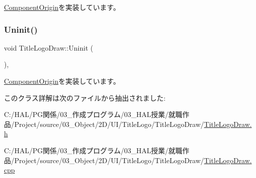 \mbox{\hyperlink{class_component_origin_a9f674891257f2272b1636d8b6bb05d81}{Component\+Origin}}を実装しています。

\mbox{\label{class_title_logo_draw_a07bbf9e8de5c7b9ee028408496c13c50}} 
\subsubsection{\texorpdfstring{Uninit()}{Uninit()}}
{\footnotesize\ttfamily void Title\+Logo\+Draw\+::\+Uninit (\begin{DoxyParamCaption}{ }\end{DoxyParamCaption})\hspace{0.3cm}{\ttfamily [override]}, {\ttfamily [virtual]}}



\mbox{\hyperlink{class_component_origin_a9f89a93f9c1954bd53f9750e35e6089d}{Component\+Origin}}を実装しています。



このクラス詳解は次のファイルから抽出されました\+:\begin{DoxyCompactItemize}
\item 
C\+:/\+H\+A\+L/\+P\+G関係/03\+\_\+作成プログラム/03\+\_\+\+H\+A\+L授業/就職作品/\+Project/source/03\+\_\+\+Object/2\+D/\+U\+I/\+Title\+Logo/\+Title\+Logo\+Draw/\mbox{\hyperlink{_title_logo_draw_8h}{Title\+Logo\+Draw.\+h}}\item 
C\+:/\+H\+A\+L/\+P\+G関係/03\+\_\+作成プログラム/03\+\_\+\+H\+A\+L授業/就職作品/\+Project/source/03\+\_\+\+Object/2\+D/\+U\+I/\+Title\+Logo/\+Title\+Logo\+Draw/\mbox{\hyperlink{_title_logo_draw_8cpp}{Title\+Logo\+Draw.\+cpp}}\end{DoxyCompactItemize}
